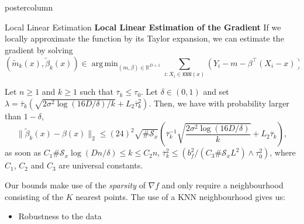 \documentclass[dvipsnames]{beamer}
\DeclareMathOperator*{\argmin}{arg\,min}
\begin{document}
\begin{frame}
\begin{columns}
\begin{column}{.5\textwidth}
\begin{beamercolorbox}[center]{postercolumn}
\begin{minipage}{.98\textwidth}
{\begin{myblock}{Local Linear Estimation}
                        \textbf{Local Linear Estimation of the Gradient}\newline
                        If we locally approximate the function by its Taylor expansion, we can estimate the gradient by solving
                        \begin{equation*}
                            (\tilde m_{k}   (x) , \tilde \beta_k (x)) \in
                            \argmin_{(m, \beta)\in \mathbb{R}^{D+ 1}} \sum_{i : X_i \in \texttt{KNN}(x)} (Y_i - m - \beta^\intercal (X_i - x))^2
                            + \lambda \lVert \beta \rVert_1 \label{lll}
                        \end{equation*}
                        \newline
                        \begin{theorem}
                            \newline
                           Let $n\geq 1$ and $k\geq 1$ such that $\overline{\tau} _ k\leq \tau_0$.  Let $\delta\in (0,1)$ and set  $\lambda =  \overline{\tau} _ k  ( \sqrt{ 2   \sigma^2   \log(16D/\delta)/k } + L_2 \overline{\tau} _ k^2 )$. Then, we have with probability larger than $1-\delta$,
                            \begin{equation*}
                            \lVert  \tilde{\beta}_k  (x) - \beta(x)  \rVert _ 2\leq (24)^2  \sqrt{\#\mathcal S_x }    \left(  \overline \tau_k ^{-1} \sqrt{\frac{ 2   \sigma^2   \log(16D/\delta)}{k} } + L_2 \overline \tau_k  \right),
                            \end{equation*}
                            as soon as $C_1  \#\mathcal S_x \log(  D n / \delta)   \leq k  \leq  C_2  n $,   $  \overline\tau_k   ^{2}     \leq  (   b_f^2 /( C_3 \#\mathcal S_x L ^2 )  \wedge \tau_0 ^2 )$, where $C_1$, $C_2$ and $C_3$ are universal constants.
                            \end{theorem}
                            \newline\newline
                            Our bounds make use of the \emph{sparsity} of $\nabla f$ and only require a neighbourhood consisting of the $K$ nearest points.\newline\newline
                            The use of a KNN neighbourhood gives us:
                            \begin{itemize}
                                \item Robustness to the data

\end{itemize}
\end{myblock}}
\end{minipage}
\end{beamercolorbox}
\end{column}
\end{columns}
\end{frame}
\end{document}
